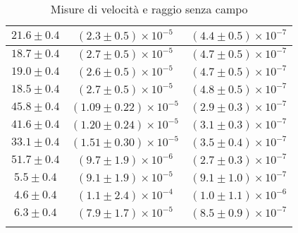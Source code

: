 \begin{longtable}[C]{|c|c|c|}
            \hline
            $21.6 \pm 0.4$ & $(2.3 \pm 0.5) \times 10^{-5}$ & $(4.4 \pm 0.5) \times 10^{-7}$ \\
            \hline
            $18.7 \pm 0.4$ & $(2.7 \pm 0.5) \times 10^{-5}$ & $(4.7 \pm 0.5) \times 10^{-7}$ \\
            \hline
            $19.0 \pm 0.4$ & $(2.6 \pm 0.5) \times 10^{-5}$ & $(4.7 \pm 0.5) \times 10^{-7}$ \\
            \hline
            $18.5 \pm 0.4$ & $(2.7 \pm 0.5) \times 10^{-5}$ & $(4.8 \pm 0.5) \times 10^{-7}$ \\
            \hline
            $45.8 \pm 0.4$ & $(1.09 \pm 0.22) \times 10^{-5}$ & $(2.9 \pm 0.3) \times 10^{-7}$ \\
            \hline
            $41.6 \pm 0.4$ & $(1.20 \pm 0.24) \times 10^{-5}$ & $(3.1 \pm 0.3) \times 10^{-7}$ \\
            \hline
            $33.1 \pm 0.4$ & $(1.51 \pm 0.30) \times 10^{-5}$ & $(3.5 \pm 0.4) \times 10^{-7}$ \\
            \hline
            $51.7 \pm 0.4$ & $(9.7 \pm 1.9) \times 10^{-6}$ & $(2.7 \pm 0.3) \times 10^{-7}$ \\
            \hline
            $5.5 \pm 0.4$ & $(9.1 \pm 1.9) \times 10^{-5}$ & $(9.1 \pm 1.0) \times 10^{-7}$ \\
            \hline
            $4.6 \pm 0.4$ & $(1.1 \pm 2.4) \times 10^{-4}$ & $(1.0 \pm 1.1) \times 10^{-6}$ \\
            \hline
            $6.3 \pm 0.4$ & $(7.9 \pm 1.7) \times 10^{-5}$ & $(8.5 \pm 0.9) \times 10^{-7}$ \\
            \hline
            \caption{Misure di velocità e raggio senza campo}
        \end{longtable}

